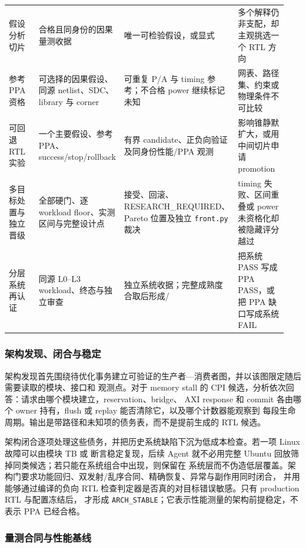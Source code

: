 \documentclass[UTF8,a4paper,zihao=-4,oneside]{ctexart}
\newcommand{\statusword}[1]{\texttt{#1}}
\begin{document}
\begin{longtable}{@{}L{0.19\linewidth}L{0.22\linewidth}L{0.28\linewidth}L{0.25\linewidth}@{}}
  假设分析切片 & 合格且同身份的因果量测收据 & 唯一可检验假设，或显式  & 多个解释仍非支配，却主观挑选一个 RTL 方向 \\
  参考 PPA 资格 & 可选择的因果假设、同源 netlist、SDC、library 与 corner & 可重复 P/A 与 timing 参考；不合格 power 继续标记未知 & 网表、路径集、约束或物理条件不可比较 \\
  可回退 RTL 实验 & 一个主要假设、参考 PPA、success/stop/rollback & 有界 candidate、正负向验证及同身份性能/PPA 观测 & 影响锥静默扩大，或用中间切片申请 promotion \\
  多目标处置与独立晋级 & 全部硬门、逐 workload floor、实测区间与完整设计点 & 接受、回滚、RESEARCH\_REQUIRED、Pareto 位置及独立 \texttt{front.py} 裁决 & timing 失败、区间重叠或 power 未资格化却被隐藏评分越过 \\
  分层系统再认证 & 同源 L0--L3 workload、终态与独立审查 & 独立系统收据；完整成熟度合取后形成\newline{}/ & 把系统 PASS 写成 PPA PASS，或把 PPA 缺口写成系统 FAIL \\
\end{longtable}
\endgroup

\subsubsection{架构发现、闭合与稳定}

架构发现首先围绕待优化事务建立可验证的生产者—消费者图，并以该图限定随后需要读取的模块、接口和
观测点。对于 memory stall 的 CPI 候选，分析依次回答：请求由哪个模块建立，reservation、bridge、
AXI response 和 commit 各由哪个 owner 持有，flush 或 replay 能否清除它，以及哪个计数器能观察到
每段生命周期。输出是带路径和未知项的债务表，而不是提前生成的 RTL 候选。

架构闭合逐项处理这些债务，并把历史系统缺陷下沉为低成本检查。若一项 Linux 故障可以由模块 TB 或
断言稳定复现，后续 Agent 就不必用完整 Ubuntu 回放筛掉同类候选；若只能在系统组合中出现，则保留在
系统层而不伪造低层覆盖。架构门要求功能回归、双发射/乱序合同、精确恢复、异常与副作用同时闭合，
并用能够通过编译的负向 RTL 检查判定器是否真的对目标错误敏感。只有 production RTL 与配置冻结后，
才形成 \statusword{ARCH\_STABLE}；它表示性能测量的架构前提稳定，不表示 PPA 已经合格。

\subsubsection{量测合同与性能基线}
\end{document}
